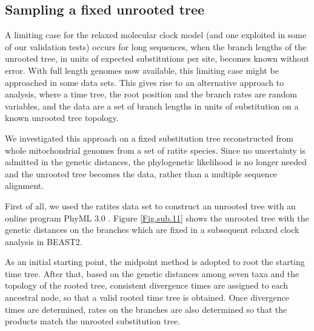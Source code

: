 \documentclass{bmcart}
\newcommand{\alexei}[1]{{\textcolor{green}{#1}}}
\begin{document}
\subsection*{Sampling a fixed unrooted tree}

A limiting case for the relaxed molecular clock model (and one exploited in some of our validation tests) occurs for long sequences, when the branch lengths of the unrooted tree, in units of expected substitutions per site, becomes known without error.  With full length genomes now available, this limiting case might be approached in some data sets. This gives rise to an alternative approach to analysis, where a time tree, the root position and the branch rates are random variables, and the data are a set of branch lengths in units of substitution on a known unrooted tree topology.

We investigated this approach on a fixed substitution tree reconstructed from whole mitochondrial genomes from a set of ratite species. Since no uncertainty is admitted in the genetic distances, the phylogenetic likelihood is no longer needed and the unrooted tree becomes the data, rather than a multiple sequence alignment.

First of all, we used the ratites data set to construct an unrooted tree with an online program PhyML 3.0 \cite{phyml,guindon2010new}.  Figure \ref{Fig.sub.11} shows the unrooted tree with the genetic distances on the branches which are fixed in a subsequent relaxed clock analysis in BEAST2.

As an initial starting point, the midpoint method is adopted to root the starting time tree. After that, based on the genetic distances among seven taxa and the topology of the rooted tree, consistent divergence times are assigned to each ancestral node, so that a valid rooted time tree is obtained. Once divergence times are determined, rates on the branches are also determined so that the products match the unrooted substitution tree.
\end{document}
